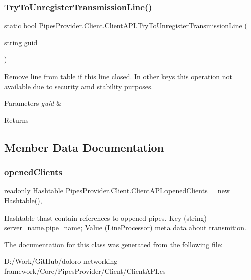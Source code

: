 \subsubsection{\texorpdfstring{Try\+To\+Unregister\+Transmission\+Line()}{TryToUnregisterTransmissionLine()}}
{\footnotesize\ttfamily static bool Pipes\+Provider.\+Client.\+Client\+A\+P\+I.\+Try\+To\+Unregister\+Transmission\+Line (\begin{DoxyParamCaption}\item[{string}]{guid }\end{DoxyParamCaption})\hspace{0.3cm}{\ttfamily [static]}}



Remove line from table if this line closed. In other keys this operation not available due to security amd stability purposes. 


\begin{DoxyParams}{Parameters}
{\em guid} & \\
\hline
\end{DoxyParams}
\begin{DoxyReturn}{Returns}

\end{DoxyReturn}


\subsection{Member Data Documentation}
\mbox{\label{class_pipes_provider_1_1_client_1_1_client_a_p_i_aafef8e556d18d889412c1f48451250c4}} 
\subsubsection{\texorpdfstring{opened\+Clients}{openedClients}}
{\footnotesize\ttfamily readonly Hashtable Pipes\+Provider.\+Client.\+Client\+A\+P\+I.\+opened\+Clients = new Hashtable()\hspace{0.3cm}{\ttfamily [static]}, {\ttfamily [private]}}



Hashtable thast contain references to oppened pipes. Key (string) server\+\_\+name.\+pipe\+\_\+name; Value (Line\+Processor) meta data about transmition. 



The documentation for this class was generated from the following file\+:\begin{DoxyCompactItemize}
\item 
D\+:/\+Work/\+Git\+Hub/doloro-\/networking-\/framework/\+Core/\+Pipes\+Provider/\+Client/Client\+A\+P\+I.\+cs\end{DoxyCompactItemize}
